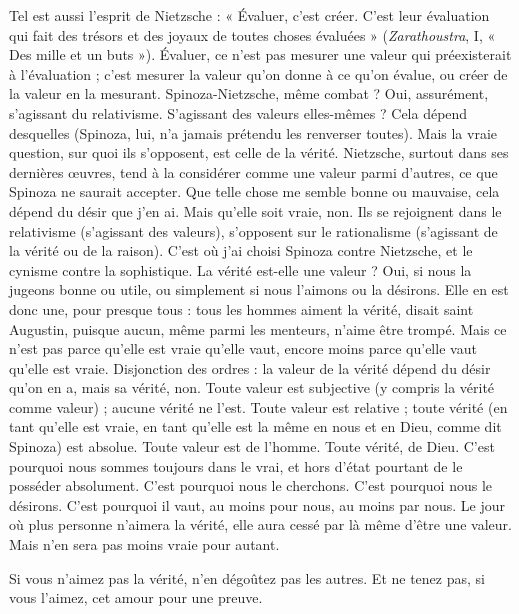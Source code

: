 Tel est aussi l'esprit de Nietzsche : « Évaluer, c’est créer. C’est leur évaluation
qui fait des trésors et des joyaux de toutes choses évaluées » ({\it Zarathoustra},
I, « Des mille et un buts »). Évaluer, ce n’est pas mesurer une valeur qui
préexisterait à l'évaluation ; c’est mesurer la valeur qu’on donne à ce qu’on
évalue, ou créer de la valeur en la mesurant. Spinoza-Nietzsche, même
combat ? Oui, assurément, s'agissant du relativisme. S'agissant des valeurs elles-mêmes ?
Cela dépend desquelles (Spinoza, lui, n’a jamais prétendu les renverser
toutes). Mais la vraie question, sur quoi ils s’opposent, est celle de la vérité.
Nietzsche, surtout dans ses dernières œuvres, tend à la considérer comme une
valeur parmi d’autres, ce que Spinoza ne saurait accepter. Que telle chose me
semble bonne ou mauvaise, cela dépend du désir que j’en ai. Mais qu’elle soit
vraie, non. Ils se rejoignent dans le relativisme (s'agissant des valeurs), s’opposent
sur le rationalisme (s’agissant de la vérité ou de la raison). C’est où j'ai
choisi Spinoza contre Nietzsche, et le cynisme contre la sophistique. La vérité
est-elle une valeur ? Oui, si nous la jugeons bonne ou utile, ou simplement si
nous l’aimons ou la désirons. Elle en est donc une, pour presque tous : tous les
hommes aiment la vérité, disait saint Augustin, puisque aucun, même parmi les
menteurs, n’aime être trompé. Mais ce n’est pas parce qu’elle est vraie qu’elle
vaut, encore moins parce qu'elle vaut qu’elle est vraie. Disjonction des ordres :
la valeur de la vérité dépend du désir qu’on en a, mais sa vérité, non. Toute
valeur est subjective (y compris la vérité comme valeur) ; aucune vérité ne l’est.
Toute valeur est relative ; toute vérité (en tant qu’elle est vraie, en tant qu’elle
est la même en nous et en Dieu, comme dit Spinoza) est absolue. Toute valeur
est de l’homme. Toute vérité, de Dieu. C’est pourquoi nous sommes toujours
dans le vrai, et hors d’état pourtant de le posséder absolument. C’est pourquoi
nous le cherchons. C’est pourquoi nous le désirons. C’est pourquoi il vaut, au
moins pour nous, au moins par nous. Le jour où plus personne n’aimera la
vérité, elle aura cessé par là même d’être une valeur. Mais n’en sera pas moins
vraie pour autant.

Si vous n’aimez pas la vérité, n’en dégoûtez pas les autres. Et ne tenez pas,
si vous l’aimez, cet amour pour une preuve.

